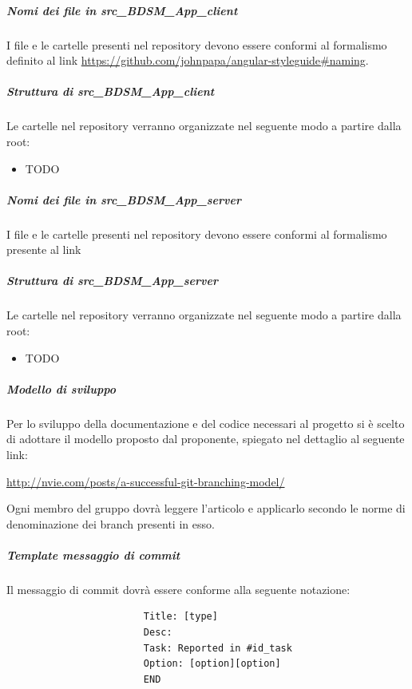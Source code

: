 				\subparagraph{Nomi dei file in src\_BDSM\_App\_client}
				I file e le cartelle presenti nel repository devono essere conformi al formalismo definito al link \url{https://github.com/johnpapa/angular-styleguide#naming}.

				\subparagraph{Struttura di src\_BDSM\_App\_client}
				Le cartelle nel repository verranno organizzate nel seguente modo a partire dalla root:
					\begin{itemize}
						\item TODO
					\end{itemize}

				\subparagraph{Nomi dei file in src\_BDSM\_App\_server}
				I file e le cartelle presenti nel repository devono essere conformi al formalismo presente al link

				\subparagraph{Struttura di src\_BDSM\_App\_server}
				Le cartelle nel repository verranno organizzate nel seguente modo a partire dalla root:
					\begin{itemize}
						\item TODO
					\end{itemize}




				\subparagraph{Modello di sviluppo}
				Per lo sviluppo della documentazione e del codice necessari al progetto si è scelto di adottare il modello proposto dal proponente, spiegato nel dettaglio al seguente link:
					\begin{center}
						\url{http://nvie.com/posts/a-successful-git-branching-model/}
					\end{center}
					Ogni membro del gruppo dovrà leggere l'articolo e applicarlo secondo le norme di denominazione dei branch presenti in esso.

				\subparagraph{Template messaggio di commit}
				\label{sec:messaggio_di_commit}
				Il messaggio di commit dovrà essere conforme alla seguente notazione:
					\begin{verbatim}
						Title: [type]
						Desc:
						Task: Reported in #id_task
						Option: [option][option]
						END
					\end{verbatim}
				
